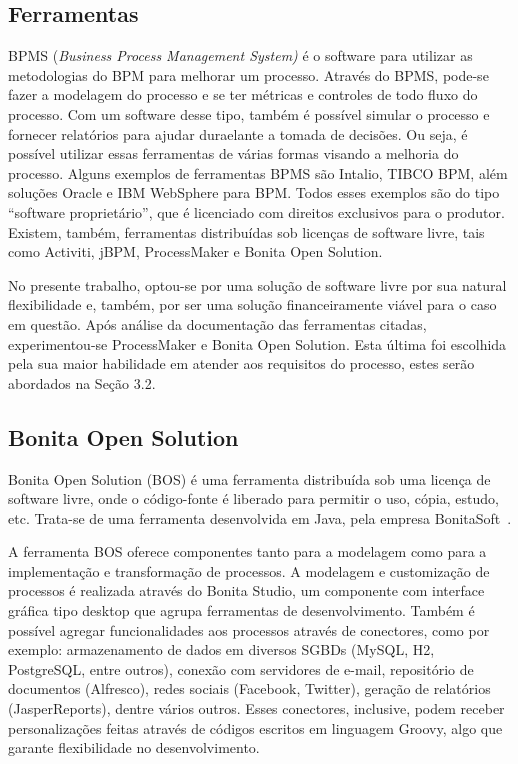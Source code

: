 \documentclass[12pt]{article}
\begin{document}
\subsection{Ferramentas}

BPMS (\emph{Business Process Management System)} é o software para utilizar as metodologias do BPM para melhorar um processo. Através do BPMS, pode-se fazer a modelagem do processo e se ter métricas e controles de todo fluxo do processo. Com um software desse tipo, também é possível simular o processo e fornecer relatórios para ajudar duraelante a tomada de decisões. Ou seja, é possível utilizar essas ferramentas de várias formas visando a melhoria do processo. Alguns exemplos de ferramentas BPMS são Intalio, TIBCO BPM, além soluções Oracle e IBM WebSphere para BPM. Todos esses exemplos são do tipo “software proprietário”, que é licenciado com direitos exclusivos para o produtor. Existem, também, ferramentas distribuídas sob licenças de software livre, tais como Activiti, jBPM, ProcessMaker e Bonita Open Solution.

No presente trabalho, optou-se por uma solução de software livre por sua natural flexibilidade e, também, por ser uma solução financeiramente viável para o caso em questão. Após análise da documentação das ferramentas citadas, experimentou-se ProcessMaker e Bonita Open Solution. Esta última foi escolhida pela sua maior habilidade em atender aos requisitos do processo, estes serão abordados na Seção 3.2.

\subsection{Bonita Open Solution}

Bonita Open Solution (BOS) é uma ferramenta distribuída sob uma licença de software livre, onde o código-fonte é liberado para permitir o uso, cópia, estudo, etc. Trata-se de uma ferramenta desenvolvida em Java, pela empresa BonitaSoft~\cite{BONITASOFT}.

A ferramenta BOS oferece componentes tanto para a modelagem como para a implementação e transformação de processos. A modelagem e customização de processos é realizada através do Bonita Studio, um componente com interface gráfica tipo desktop que agrupa ferramentas de desenvolvimento. Também é possível agregar funcionalidades aos processos através de conectores, como por exemplo: armazenamento de dados em diversos SGBDs (MySQL, H2, PostgreSQL, entre outros), conexão com servidores de e-mail, repositório de documentos (Alfresco), redes sociais (Facebook, Twitter), geração de relatórios (JasperReports), dentre vários outros. Esses conectores, inclusive, podem receber personalizações feitas através de códigos escritos em linguagem Groovy, algo que garante flexibilidade no desenvolvimento.
\end{document}
